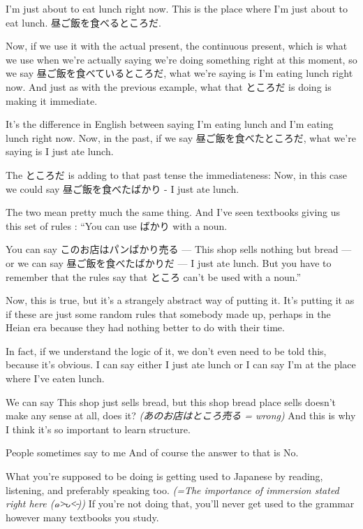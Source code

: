 I'm just about to eat lunch right now. This is the place where I'm just about to eat lunch. 昼ご飯を食べるところだ.

Now, if we use it with the actual present, the continuous present, which is what we use when we're actually saying we're doing something right at this moment, so we say 昼ご飯を食べているところだ, what we're saying is I'm eating lunch right now. And just as with the previous example, what that ところだ is doing is making it immediate.

It's the difference in English between saying I'm eating lunch and I'm eating lunch right now. Now, in the past, if we say 昼ご飯を食べたところだ, what we're saying is I just ate lunch.

The ところだ is adding to that past tense the immediateness:  Now, in this case we could say 昼ご飯を食べたばかり - I just ate lunch.

The two mean pretty much the same thing. And I've seen textbooks giving us this set of rules : “You can use ばかり with a noun.

You can say このお店はパンばかり売る --- This shop sells nothing but bread --- or we can say 昼ご飯を食べたばかりだ --- I just ate lunch. But you have to remember that the rules say that ところ can't be used with a noun.”

Now, this is true, but it's a strangely abstract way of putting it. It's putting it as if these are just some random rules that somebody made up, perhaps in the Heian era because they had nothing better to do with their time.

In fact, if we understand the logic of it, we don't even need to be told this, because it's obvious. I can say either I just ate lunch or I can say I'm at the place where I've eaten lunch.

We can say This shop just sells bread, but this shop bread place sells doesn't make any sense at all, does it? {\em (あのお店はところ売る = wrong)} And this is why I think it's so important to learn structure.

People sometimes say to me  And of course the answer to that is No.

What you're supposed to be doing is getting used to Japanese by reading, listening, and preferably speaking too. {\em (=The importance of immersion stated right here (๑˃̵ᴗ˂̵))} If you're not doing that, you'll never get used to the grammar however many textbooks you study.

